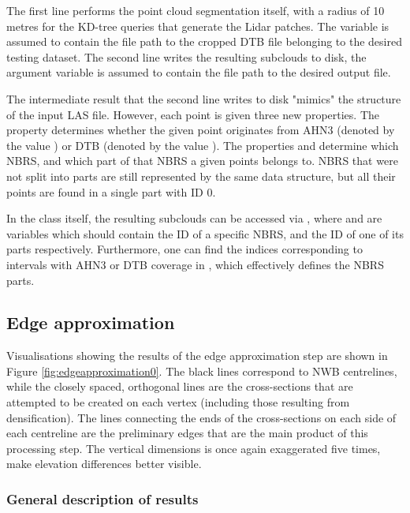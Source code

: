 The first line performs the point cloud segmentation itself, with a radius of 10 metres for the KD-tree queries that generate the Lidar patches. The variable  is assumed to contain the file path to the cropped DTB file belonging to the desired testing dataset. The second line writes the resulting subclouds to disk, the argument variable is assumed to contain the file path to the desired output file.

The intermediate result that the second line writes to disk "mimics" the structure of the input LAS file. However, each point is given three new properties. The property  determines whether the given point originates from AHN3 (denoted by the value ) or DTB (denoted by the value ). The properties  and  determine which NBRS, and which part of that NBRS a given points belongs to. NBRS that were not split into parts are still represented by the same data structure, but all their points are found in a single part with ID 0.

In the class itself, the resulting subclouds can be accessed via , where  and  are variables which should contain the ID of a specific NBRS, and the ID of one of its parts respectively. Furthermore, one can find the indices corresponding to intervals with AHN3 or DTB coverage in , which effectively defines the NBRS parts.

\subsection{Edge approximation}
\label{sub:r_edgeapproximation}

Visualisations showing the results of the edge approximation step are shown in Figure \ref{fig:edgeapproximation0}. The black lines correspond to NWB centrelines, while the closely spaced, orthogonal lines are the cross-sections that are attempted to be created on each vertex (including those resulting from densification). The lines connecting the ends of the cross-sections on each side of each centreline are the preliminary edges that are the main product of this processing step. The vertical dimensions is once again exaggerated five times, make elevation differences better visible.

\subsubsection{General description of results}


